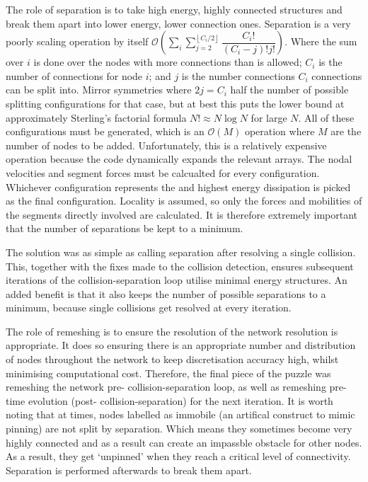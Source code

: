 The role of separation is to take high energy, highly connected structures and break them apart into lower energy, lower connection ones. Separation is a very poorly scaling operation by itself $\mathcal{O}\left(\sum\limits_{i}\sum\limits_{j=2}^{\left\lfloor C_i/2 \right\rfloor} \dfrac{C_i!}{(C_i-j)! j!}\right)$. Where the sum over $i$ is done over the nodes with more connections than is allowed; $C_i$ is the number of connections for node $i$; and $j$ is the number connections $C_i$ connections can be split into. Mirror symmetries where $2j = C_i$ half the number of possible splitting configurations for that case, but at best this puts the lower bound at approximately Sterling's factorial formula $N! \approx N\log{N}$ for large $N$. All of these configurations must be generated, which is an $\mathcal{O}(M)$ operation where $M$ are the number of nodes to be added. Unfortunately, this is a relatively expensive operation because the code dynamically expands the relevant arrays. The nodal velocities and segment forces must be calcualted for every configuration. Whichever configuration represents the and highest energy dissipation is picked as the final configuration. Locality is assumed, so only the forces and mobilities of the segments directly involved are calculated. It is therefore extremely important that the number of separations be kept to a minimum.

The solution was as simple as calling separation after resolving a single collision. This, together with the fixes made to the collision detection, ensures subsequent iterations of the collision-separation loop utilise minimal energy structures. An added benefit is that it also keeps the number of possible separations to a minimum, because single collisions get resolved at every iteration.

The role of remeshing is to ensure the resolution of the network resolution is appropriate. It does so ensuring there is an appropriate number and distribution of nodes throughout the network to keep discretisation accuracy high, whilst minimising computational cost. Therefore, the final piece of the puzzle was remeshing the network pre- collision-separation loop, as well as remeshing pre- time evolution (post- collision-separation) for the next iteration. It is worth noting that at times, nodes labelled as immobile (an artifical construct to mimic pinning) are not split by separation. Which means they sometimes become very highly connected and as a result can create an impassble obstacle for other nodes. As a result, they get `unpinned' when they reach a critical level of connectivity. Separation is performed afterwards to break them apart.

